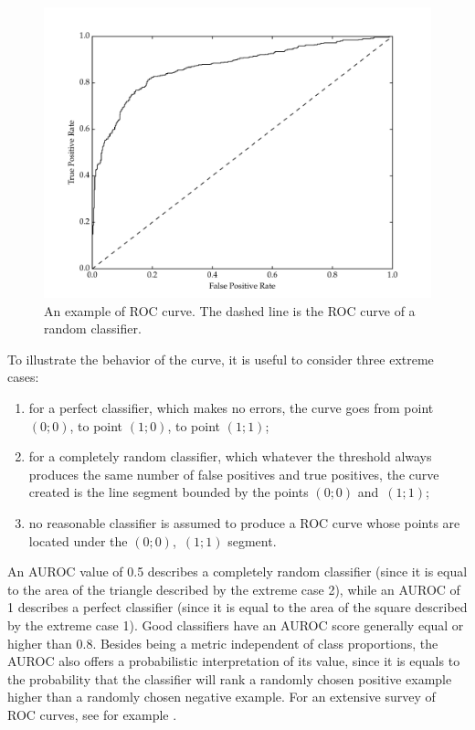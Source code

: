 \begin{figure}[h!]
    \centering
    \includegraphics[width=.8\textwidth]{Figures/Chapter5/roc}
    \caption{An example of ROC curve. The dashed line is the ROC curve of a random classifier.}
    \label{fig:roc}
\end{figure}
To illustrate the behavior of the curve, it is useful to consider three extreme cases:
\begin{enumerate}
\item for a perfect classifier, which makes no errors, the curve goes from point $(0;0)$, to point $(1;0)$, to point $(1;1)$;
\item for a completely random classifier, which whatever the threshold always produces the same number of false positives and true positives, the curve created is the line segment bounded by the points $(0;0)$ and $\,(1;1)$;
\item no reasonable classifier is assumed to produce a ROC curve whose points are located under the $(0;0)$, $\,(1;1)$ segment.
\end{enumerate}
An AUROC value of 0.5 describes a completely random classifier (since it is equal to the area of the triangle described by the extreme case 2), while an AUROC of 1 describes a perfect classifier (since it is equal to the area of the square described by the extreme case 1). Good classifiers have an AUROC score generally equal or higher than 0.8. Besides being a metric independent of class proportions, the AUROC also offers a probabilistic interpretation of its value, since it is equals to the probability that the classifier will rank a randomly chosen positive example higher than a randomly chosen negative example. For an extensive survey of ROC curves, see for example \cite{fawcett2006roc}.

